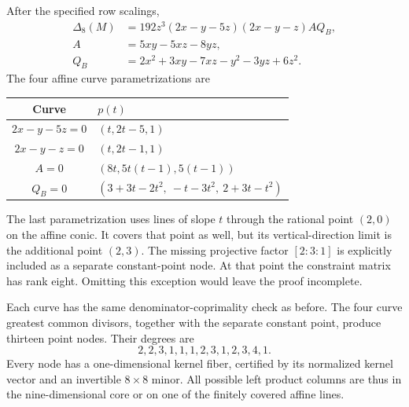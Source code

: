 \documentclass[11pt]{article}
\theoremstyle{definition}\newtheorem{definition}[theorem]{Definition}
\begin{document}
After the specified row scalings,
\begin{align}\label{eq:Bleftfactor}
\Delta_8(M)&=192z^3(2x-y-5z)(2x-y-z)A Q_B,\\
A&=5xy-5xz-8yz,\nonumber\\
Q_B&=2x^2+3xy-7xz-y^2-3yz+6z^2.\nonumber
\end{align}
The four affine curve parametrizations are
\begin{center}\small
\begin{tabular}{@{}cl@{}}\toprule
Curve & $p(t)$ \\\midrule
$2x-y-5z=0$ & $(t,2t-5,1)$\\
$2x-y-z=0$ & $(t,2t-1,1)$\\
$A=0$ & $(8t,5t(t-1),5(t-1))$\\
$Q_B=0$ & $(3+3t-2t^2,\ -t-3t^2,\ 2+3t-t^2)$\\\bottomrule
\end{tabular}\end{center}
The last parametrization uses lines of slope $t$ through the rational point $(2,0)$ on the affine conic. It covers that point as well, but its vertical-direction limit is the additional point $(2,3)$. The missing projective factor $[2:3:1]$ is explicitly included as a separate constant-point node. At that point the constraint matrix has rank eight. Omitting this exception would leave the proof incomplete.

Each curve has the same denominator-coprimality check as before. The four curve greatest common divisors, together with the separate constant point, produce thirteen point nodes. Their degrees are
\[
2,2,3,1,1,1,2,3,1,2,3,4,1.
\]
Every node has a one-dimensional kernel fiber, certified by its normalized kernel vector and an invertible $8\times8$ minor. All possible left product columns are thus in the nine-dimensional core or on one of the finitely covered affine lines.
\end{document}
